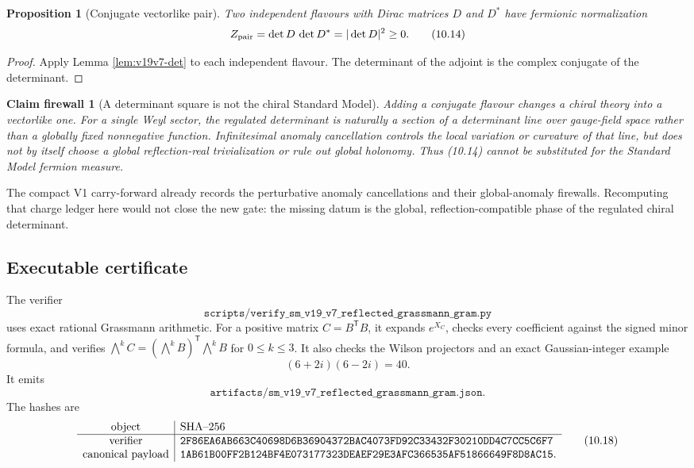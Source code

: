 \documentclass[11pt]{article}
\newtheorem{proposition}[theorem]{Proposition}
\newtheorem{firewall}[theorem]{Claim firewall}
\theoremstyle{remark}
\begin{document}
\begin{proposition}[Conjugate vectorlike pair]
\label{prop:v19v7-vectorlike}
Two independent flavours with Dirac matrices \(D\) and \(D^*\) have
fermionic normalization
\[
 Z_{\rm pair}=\det D\,\det D^*=|\det D|^2\geq0.                \tag{10.14}
\]
\end{proposition}

\begin{proof}
Apply Lemma \ref{lem:v19v7-det} to each independent flavour.  The determinant
of the adjoint is the complex conjugate of the determinant.
\end{proof}

\begin{firewall}[A determinant square is not the chiral Standard Model]
\label{fire:v19v7-chiral}
Adding a conjugate flavour changes a chiral theory into a vectorlike one.
For a single Weyl sector, the regulated determinant is naturally a section
of a determinant line over gauge-field space rather than a globally fixed
nonnegative function.  Infinitesimal anomaly cancellation controls the
local variation or curvature of that line, but does not by itself choose a
global reflection-real trivialization or rule out global holonomy.  Thus
(10.14) cannot be substituted for the Standard Model fermion measure.
\end{firewall}

The compact V1 carry-forward already records the perturbative anomaly
cancellations and their global-anomaly firewalls.  Recomputing that charge
ledger here would not close the new gate: the missing datum is the global,
reflection-compatible phase of the regulated chiral determinant.

\subsection{Executable certificate}

The verifier
\[
 \texttt{scripts/verify\_sm\_v19\_v7\_reflected\_grassmann\_gram.py}
                                                                  \tag{10.15}
\]
uses exact rational Grassmann arithmetic.  For a positive matrix
\(C=B^{\mathsf T}B\), it expands \(e^{X_C}\), checks every coefficient
against the signed minor formula, and verifies
\(\bigwedge^kC=(\bigwedge^kB)^{\mathsf T}\bigwedge^kB\) for
\(0\leq k\leq3\).  It also checks the Wilson projectors and an exact
Gaussian-integer example
\[
 (6+2i)(6-2i)=40.                                               \tag{10.16}
\]
It emits
\[
 \texttt{artifacts/sm\_v19\_v7\_reflected\_grassmann\_gram.json}.
                                                                  \tag{10.17}
\]
The hashes are
\[
\begin{array}{c|l}
\hbox{object}&\hbox{SHA--256}\\ \hline
\hbox{verifier}&
\texttt{2F86EA6AB663C40698D6B36904372BAC4073FD92C33432F30210DD4C7CC5C6F7}\\
\hbox{canonical payload}&
\texttt{1AB61B00FF2B124BF4E073177323DEAEF29E3AFC366535AF51866649F8D8AC15}.
\end{array}                                                     \tag{10.18}
\]
\end{document}
